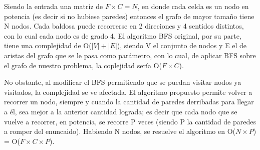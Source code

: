 Siendo la entrada una matriz de $F \times C = N$, en donde cada celda es un nodo en potencia (es decir si no hubiese paredes) entonces el grafo de mayor tamaño tiene N nodos. Cada baldosa puede recorrerse en 2 direciones y 4 sentidos distintos, con lo cual cada nodo es de grado 4. El algoritmo BFS original, por su parte, tiene una complejidad de O($|V|+|E|$), siendo V el conjunto de nodos y E el de aristas del grafo que se le pasa como parámetro, con lo cual, de aplicar BFS sobre el grafo de nuestro problema, la coplejidad sería O($F \times C$).

No obstante, al modificar el BFS permitiendo que se puedan visitar nodos ya visitados, la complejidad se ve afectada. El algoritmo propuesto permite volver a recorrer un nodo, siempre y cuando la cantidad de paredes derribadas para llegar a él, sea mejor a la anterior cantidad lograda; es decir que cada nodo que se vuelve a recorrer, en potencia, se recorre P veces (siendo P la cantidad de paredes a romper del enuncaido). Habiendo N nodos, se resuelve el algoritmo en O($N \times P$) = O($F \times C \times P$).